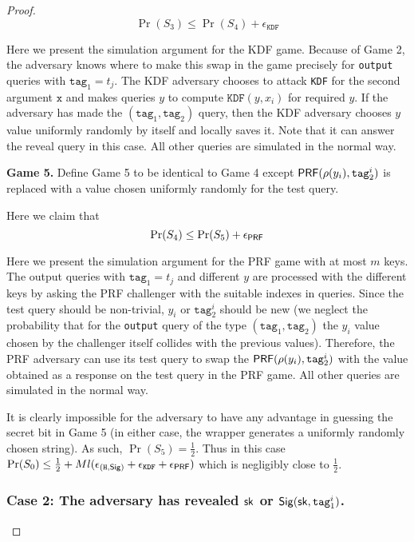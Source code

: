 \documentclass{article}
\begin{document}
\begin{proof}
$$
\Pr(S_3) \le \Pr(S_4) + \epsilon_{\texttt{KDF}}
$$

Here we present the simulation argument for the KDF game. Because of Game 2, the adversary knows where to make this swap in the game precisely for \texttt{output} queries with  $\texttt{tag}_1 =t_j$. The KDF adversary chooses to attack \texttt{KDF} for the second argument $\texttt{x}$ and makes queries $y$ to compute $\texttt{KDF}(y, x_i)$ for required $y$.  If the adversary has made the $(\texttt{tag}_1,\texttt{tag}_2)$ query, then the KDF adversary chooses $y$ value uniformly randomly by itself and locally saves it. Note that it can answer the reveal query in this case. All other queries are simulated in the normal way. 

\noindent \textbf{Game 5.} Define Game 5 to be identical to Game 4 except $\mathsf{PRF}(\rho(y_i), \texttt{tag}^i_2)$ is replaced with a value chosen uniformly randomly for the test query.

Here we claim that
$$
\Pr(S_4) \le \Pr(S_5) + \epsilon_{\mathsf{PRF}}
$$

Here we present the simulation argument for the PRF game with at most $m$ keys. The output queries with $\texttt{tag}_1 =t_j$ and different $y$ are processed with the different keys by asking the PRF challenger with the suitable indexes in queries. Since the test query should be non-trivial, $y_i$ or $\texttt{tag}_2^i$ should be new (we neglect the probability that for the \texttt{output} query of the type $(\texttt{tag}_1,\texttt{tag}_2)$ the $y_i$ value chosen by the challenger itself collides with the previous values). Therefore, the PRF adversary can use its test query to swap the $\mathsf{PRF}(\rho(y_i), \texttt{tag}^i_2)$ with the value obtained as a response on the test query in the PRF game. All other queries are simulated in the normal way.
 
It is clearly impossible for the adversary to have any advantage in guessing the secret bit in Game 5 (in either case, the wrapper generates a uniformly randomly chosen string). As such, $\Pr(S_5) = \frac{1}{2}$. Thus in this case $\Pr(S_0) \le \frac{1}{2} + Ml( \epsilon_{(\texttt{H}, \mathsf{Sig})} + \epsilon_{\texttt{KDF}} + \epsilon_{\mathsf{PRF}})$ which is negligibly close to $\frac{1}{2}$.

\subsubsection*{Case 2: The adversary has revealed $\mathsf{sk}$ or $\mathsf{Sig}(\mathsf{sk}, \texttt{tag}_1^i)$.}


\end{proof}
\end{document}
